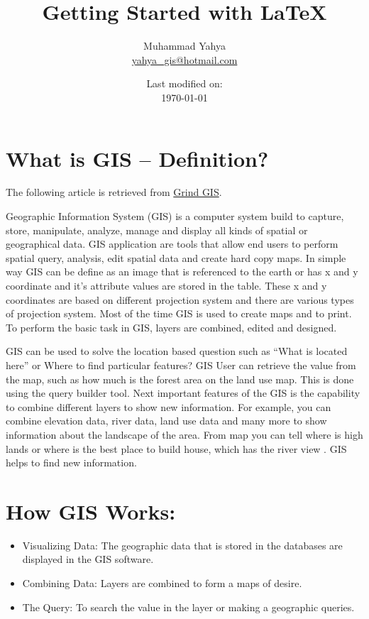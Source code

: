 \documentclass[12pt, letter]{article}
\title{Getting Started with \LaTeX}
\author{Muhammad Yahya \\
\href{mailto:yahya_gis@hotmail.com}{yahya\_gis@hotmail.com} }
\date{Last modified on: \\ \today}
\begin{document}
\begin{titlepage}
 \maketitle
 \thispagestyle{empty}
\end{titlepage}

\tableofcontents
\newpage

\section{What is GIS – Definition?}

The following article is retrieved from \href{https://grindgis.com/what-is-gis/what-is-gis-definition}{Grind GIS}.

\medskip

Geographic Information System (GIS) is a computer system build to capture, store, manipulate, analyze, manage and display all kinds of spatial or geographical data. GIS application are tools that allow end users to perform spatial query, analysis, edit spatial data and create hard copy maps. In simple way GIS can be define as an image that is referenced to the earth or has x and y coordinate and it’s attribute values are stored in the table. These x and y coordinates are based on different projection system and there are various types of projection system. Most of the time GIS is used to create maps and to print. To perform the basic task in GIS, layers are combined, edited and designed.

\medskip

GIS can be used to solve the location based question such as “What is located here” or Where to find particular features? GIS User can retrieve the value from the map, such as how much is the forest area on the land use map. This is done using the query builder tool. Next important features of the GIS is the capability to combine different layers to show new information. For example, you can combine elevation data, river data, land use data and many more to show information about the landscape of the area. From map you can tell where is high lands or where is the best place to build house, which has the river view . GIS helps to find new information.


\section{How GIS Works:}

\begin{itemize}

 \item Visualizing Data: The geographic data that is stored in the databases are displayed in the GIS software.
 \item Combining Data: Layers are combined to form a maps of desire.
 \item The Query: To search the value in the layer or making a geographic queries.

\end{itemize}
\end{document}

